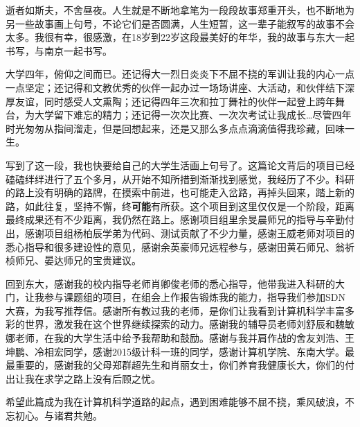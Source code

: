 \begin{Acknowledgement}{}
    \par 逝者如斯夫，不舍昼夜。人生就是不断地拿笔为一段段故事郑重开头，也不断地为另一些故事画上句号，不论它们是否圆满，人生短暂，这一辈子能叙写的故事不会太多。我很有幸，很感激，在18岁到22岁这段最美好的年华，我的故事与东大一起书写，与南京一起书写。

    \par 大学四年，俯仰之间而已。还记得大一烈日炎炎下不屈不挠的军训让我的内心一点一点坚定；还记得和文教优秀的伙伴一起办过一场场讲座、大活动，和伙伴结下深厚友谊，同时感受人文熏陶；还记得四年三次和拉丁舞社的伙伴一起登上跨年舞台，为大学留下难忘的精力；还记得一次次比赛、一次次考试让我成长\ldots 尽管四年时光匆匆从指间溜走，但是回想起来，还是又那么多点点滴滴值得我珍藏，回味一生。

    \par 写到了这一段，我也快要给自己的大学生活画上句号了。这篇论文背后的项目已经磕磕绊绊进行了五个多月，从开始不知所措到渐渐找到感觉，我经历了不少。科研的路上没有明确的路牌，在摸索中前进，也可能走入岔路，再掉头回来，踏上新的路，如此往复，坚持不懈，终\textbf{可能}有所获。这个项目到这里仅仅是一个阶段，距离最终成果还有不少距离，我仍然在路上。感谢项目组里余旻晨师兄的指导与辛勤付出，感谢项目组杨柏辰学弟为代码、测试贡献了不少力量，感谢王威老师对项目的悉心指导和很多建设性的意见，感谢余英豪师兄远程参与，感谢田黄石师兄、翁祈桢师兄、晏达师兄的宝贵建议。

    \par 回到东大，感谢我的校内指导老师肖卿俊老师的悉心指导，他带我进入科研的大门，让我参与课题组的项目，在组会上作报告锻炼我的能力，指导我们参加SDN大赛，为我写推荐信。感谢所有教过我的老师，是你们让我看到计算机科学丰富多彩的世界，激发我在这个世界继续探索的动力。感谢我的辅导员老师刘舒辰和魏敏娜老师，在我的大学生活中给予我帮助和鼓励。感谢与我并肩作战的舍友刘浩、王坤鹏、冷相宏同学，感谢2015级计科一班的同学，感谢计算机学院、东南大学。最最重要的，感谢我的父母郑群超先生和肖丽女士，你们养育我健康长大，你们的付出让我在求学之路上没有后顾之忧。

    \par 希望此篇成为我在计算机科学道路的起点，遇到困难能够不屈不挠，乘风破浪，不忘初心。与诸君共勉。

\end{Acknowledgement}